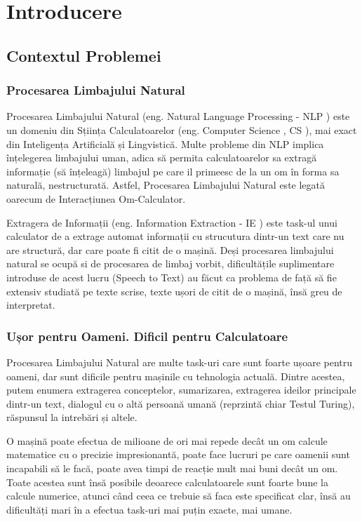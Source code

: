 \chapter{Introducere}
\label{chapter:intro}

\section{Contextul Problemei}

\subsection{Procesarea Limbajului Natural}

Procesarea Limbajului Natural (eng. Natural Language Processing - NLP ) este un domeniu din Sțiința Calculatoarelor (eng. Computer Science , CS ), mai exact din Inteligența Artificială și Lingvistică. Multe probleme din NLP implica înțelegerea limbajului uman, adica să permita calculatoarelor sa extragă informație (să înțeleagă) limbajul pe care il primeesc de la un om în forma sa naturală, nestructurată. Astfel, Procesarea Limbajului Natural este legată oarecum de Interacțiunea Om-Calculator.

Extragera de Informații (eng. Information Extraction - IE ) este task-ul unui calculator de a extrage automat informații cu strucutura dintr-un text care nu are structură, dar care poate fi citit de o mașină. Deși procesarea limbajului natural se ocupă si de procesarea de limbaj vorbit, dificultățile suplimentare introduse de acest lucru (Speech to Text) au făcut ca problema de față să fie extensiv studiată pe texte scrise, texte ușori de citit de o mașină, însă greu de interpretat.


\subsection{Ușor pentru Oameni. Dificil pentru Calculatoare}

Procesarea Limbajului Natural are multe task-uri care sunt foarte ușoare pentru oameni, dar sunt dificile pentru mașinile cu tehnologia actuală. Dintre acestea, putem enumera extragerea conceptelor, sumarizarea, extragerea ideilor principale dintr-un text, dialogul cu o altă persoană umană (reprzintă chiar Testul Turing), răspunsul la intrebări și altele.

O mașină poate efectua de milioane de ori mai repede decât un om calcule matematice cu o precizie impresionantă, poate face lucruri pe care oamenii sunt incapabili să le facă, poate avea timpi de reacție mult mai buni decât un om. Toate acestea sunt însă posibile deoarece calculatoarele sunt foarte bune la calcule numerice, atunci când ceea ce trebuie să faca este specificat clar, însă au dificultăți mari în a efectua task-uri mai puțin exacte, mai umane.

